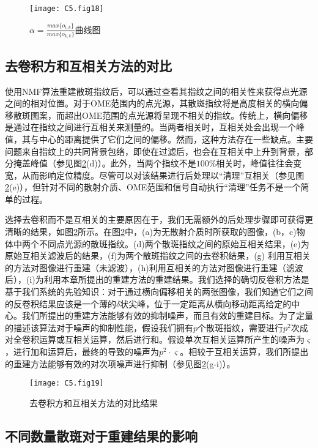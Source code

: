 \begin{figure}[htp]
	\centering
	\texttt{[image: C5.fig18]}
	\caption{$\alpha= \frac {max\{o_{i,k}\}} {max\{o_{k,k}\}}$曲线图}
	\label{fig:5.18}
\end{figure}

\subsection{去卷积方和互相关方法的对比}

使用NMF算法重建散斑指纹后，可以通过查看其指纹之间的相关性来获得点光源之间的相对位置。对于OME范围内的点光源，其散斑指纹将是高度相关的横向偏移散斑图案，而超出OME范围的点光源将呈现不相关的指纹。传统上，横向偏移是通过在指纹之间进行互相关来测量的。当两者相关时，互相关处会出现一个峰值，其与中心的距离提供了它们之间的偏移。然而，这种方法存在一些缺点。主要问题来自指纹上的共同背景包络，即使在过滤后，也会在互相关中上升到背景，部分掩盖峰值（参见图\ref{fig:5.19}(d)）。此外，当两个指纹不是$100 \%$相关时，峰值往往会变宽，从而影响定位精度。尽管可以对该结果进行后处理以“清理”互相关（参见图 \ref{fig:5.19}(e)），但针对不同的散射介质、OME范围和信号自动执行“清理”任务不是一个简单的过程。

选择去卷积而不是互相关的主要原因在于，我们无需额外的后处理步骤即可获得更清晰的结果，如图\ref{fig:5.19}所示。在图\ref{fig:5.19}中，(a)为无散射介质时所获取的图像，(b，c)物体中两个不同点光源的散斑指纹。(d)两个散斑指纹之间的原始互相关结果，(e)为原始互相关滤波后的结果，(f)为两个散斑指纹之间的去卷积结果，(g) 利用互相关的方法对图像进行重建（未滤波），(h)利用互相关的方法对图像进行重建（滤波后），(i)为利用本章所提出的重建方法的重建结果。我们选择的确切反卷积方法是基于我们系统的先验知识：对于通过横向偏移相关的两张图像，我们知道它们之间的反卷积结果应该是一个薄的$\delta$状尖峰，位于一定距离从横向移动距离给定的中心。我们所提出的重建方法能够有效的抑制噪声，而且有效的重建目标。为了定量的描述该算法对于噪声的抑制性能，假设我们拥有$p$个散斑指纹，需要进行$p^2$次成对全卷积运算或互相关运算，然后进行和。假设单次互相关运算所产生的噪声为$\varsigma$，进行加和运算后，最终的导致的噪声为$p^2 \cdot \varsigma$。相较于互相关运算，我们所提出的重建方法能够有效的对次项噪声进行抑制（参见图\ref{fig:5.19}(g-i)）。

\begin{figure}[htp]
	\centering
	\texttt{[image: C5.fig19]}
	\caption{去卷积方和互相关方法的对比结果}
	\label{fig:5.19}
\end{figure}

\subsection{不同数量散斑对于重建结果的影响}

